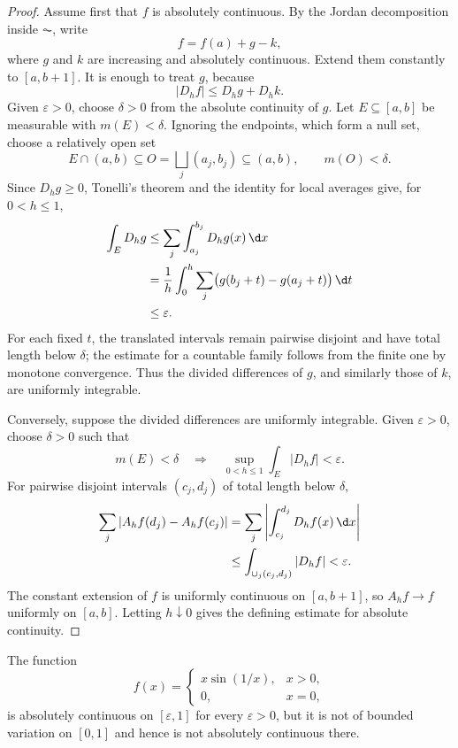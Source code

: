 \begin{proof}
Assume first that $f$ is absolutely continuous. By the Jordan decomposition inside $\AC$, write
\[
f=f(a)+g-k,
\]
where $g$ and $k$ are increasing and absolutely continuous. Extend them constantly to $[a,b+1]$. It is enough to treat $g$, because
\[
|D_hf|\leq D_hg+D_hk.
\]
Given $\varepsilon>0$, choose $\delta>0$ from the absolute continuity of $g$. Let $E\subseteq[a,b]$ be measurable with $m(E)<\delta$. Ignoring the endpoints, which form a null set, choose a relatively open set
\[
E\cap(a,b)\subseteq O=\bigsqcup_j(a_j,b_j)\subseteq(a,b),
\qquad m(O)<\delta.
\]
Since $D_hg\geq0$, Tonelli's theorem and the identity for local averages give, for $0<h\leq1$,
\[
\begin{aligned}
\int_E D_hg
&\leq\sum_j\int_{a_j}^{b_j}D_hg(x)\,\d x\\
&=\frac1h\int_0^h
  \sum_j\bigl(g(b_j+t)-g(a_j+t)\bigr)\,\d t\\
&\leq\varepsilon.
\end{aligned}
\]
For each fixed $t$, the translated intervals remain pairwise disjoint and have total length below $\delta$; the estimate for a countable family follows from the finite one by monotone convergence. Thus the divided differences of $g$, and similarly those of $k$, are uniformly integrable.

Conversely, suppose the divided differences are uniformly integrable. Given $\varepsilon>0$, choose $\delta>0$ such that
\[
m(E)<\delta\quad\Longrightarrow\quad
\sup_{0<h\leq1}\int_E|D_hf|<\varepsilon.
\]
For pairwise disjoint intervals $(c_j,d_j)$ of total length below $\delta$,
\[
\begin{aligned}
\sum_j|A_hf(d_j)-A_hf(c_j)|
&=\sum_j\left|\int_{c_j}^{d_j}D_hf(x)\,\d x\right|\\
&\leq\int_{\cup_j(c_j,d_j)}|D_hf|<\varepsilon.
\end{aligned}
\]
The constant extension of $f$ is uniformly continuous on $[a,b+1]$, so $A_hf\to f$ uniformly on $[a,b]$. Letting $h\downarrow0$ gives the defining estimate for absolute continuity.
\end{proof}

\begin{eg}
The function
\[
f(x)=\begin{cases}x\sin(1/x),&x>0,\\0,&x=0,
\end{cases}
\]
is absolutely continuous on $[\varepsilon,1]$ for every $\varepsilon>0$, but it is not of bounded variation on $[0,1]$ and hence is not absolutely continuous there.
\end{eg}


